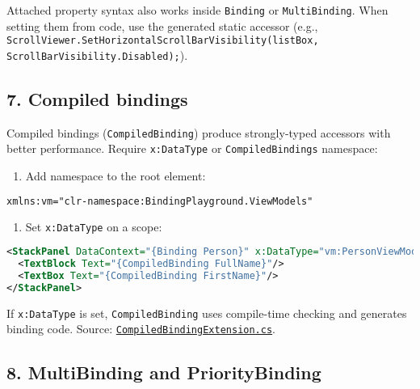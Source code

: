 Attached property syntax also works inside
\passthrough{\lstinline!Binding!} or
\passthrough{\lstinline!MultiBinding!}. When setting them from code, use
the generated static accessor (e.g.,
\passthrough{\lstinline!ScrollViewer.SetHorizontalScrollBarVisibility(listBox, ScrollBarVisibility.Disabled);!}).

\subsection{7. Compiled bindings}\label{compiled-bindings}

Compiled bindings (\passthrough{\lstinline!CompiledBinding!}) produce
strongly-typed accessors with better performance. Require
\passthrough{\lstinline!x:DataType!} or
\passthrough{\lstinline!CompiledBindings!} namespace:

\begin{enumerate}
\def\labelenumi{\arabic{enumi}.}
\tightlist
\item
  Add namespace to the root element:
\end{enumerate}

\begin{lstlisting}[language=XML]
xmlns:vm="clr-namespace:BindingPlayground.ViewModels"
\end{lstlisting}

\begin{enumerate}
\def\labelenumi{\arabic{enumi}.}
\setcounter{enumi}{1}
\tightlist
\item
  Set \passthrough{\lstinline!x:DataType!} on a scope:
\end{enumerate}

\begin{lstlisting}[language=XML]
<StackPanel DataContext="{Binding Person}" x:DataType="vm:PersonViewModel">
  <TextBlock Text="{CompiledBinding FullName}"/>
  <TextBox Text="{CompiledBinding FirstName}"/>
</StackPanel>
\end{lstlisting}

If \passthrough{\lstinline!x:DataType!} is set,
\passthrough{\lstinline!CompiledBinding!} uses compile-time checking and
generates binding code. Source:
\href{https://github.com/AvaloniaUI/Avalonia/blob/master/src/Markup/Avalonia.Markup.Xaml/MarkupExtensions/CompiledBindingExtension.cs}{\passthrough{\lstinline!CompiledBindingExtension.cs!}}.

\subsection{8. MultiBinding and
PriorityBinding}\label{multibinding-and-prioritybinding}

